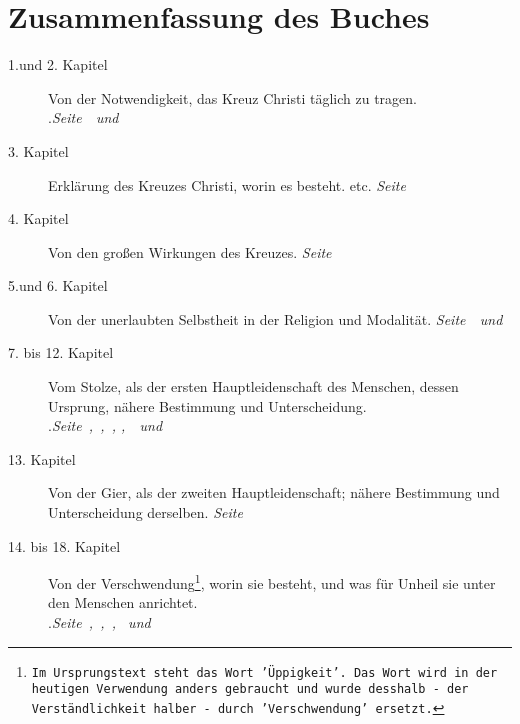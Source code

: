 \documentclass[pdftex,pagesize, 10pt]{scrbook}
\begin{document}
\chapter{Zusammenfassung des Buches}
\begin{description}
\item[1.und 2. Kapitel] Von der Notwendigkeit, das Kreuz Christi täglich zu
tragen.\\
.\dotfill \textit{Seite~\pageref{kap1}~und~\pageref{kap2}}\\
\item[3. Kapitel] Erklärung des Kreuzes Christi, worin es besteht. etc.
\dotfill \textit{Seite~\pageref{kap3}}\\
\item[4. Kapitel] Von den großen Wirkungen des Kreuzes.
\dotfill \textit{Seite~\pageref{kap4}}\\
\item[5.und 6. Kapitel] Von der unerlaubten Selbstheit in der Religion und
Modalität.
\dotfill \textit{Seite~\pageref{kap5}~und~\pageref{kap6}}\\
\item[7. bis 12. Kapitel] Vom Stolze, als der ersten Hauptleidenschaft des
Menschen, dessen Ursprung, nähere Bestimmung und Unterscheidung.\\
.\dotfill \textit{Seite~\pageref{kap7},~\pageref{kap8},~\pageref{kap9}, \pageref{kap10},~\pageref{kap11}~und~\pageref{kap12}}\\
\item[13. Kapitel] Von der Gier, als der zweiten Hauptleidenschaft; nähere
Bestimmung und Unterscheidung derselben.
\dotfill \textit{Seite~\pageref{kap13}}\\
\item[14. bis 18. Kapitel] Von der Verschwendung\footnote{\texttt{Im Ursprungstext steht
das Wort 'Üppigkeit'. Das Wort wird in der heutigen Verwendung anders
gebraucht und wurde desshalb - der Verständlichkeit halber - durch
'Verschwendung' ersetzt.}}, worin sie besteht, und was für Unheil sie unter den
Menschen anrichtet.
\\.\dotfill \textit{Seite~\pageref{kap14},~\pageref{kap15},~\pageref{kap16},
\pageref{kap17}~und~\pageref{kap18}}\\
\end{description}



















\end{document}
